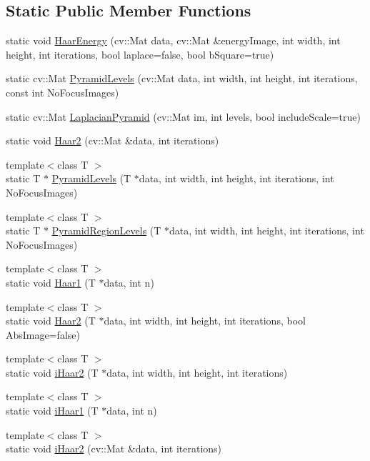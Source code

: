 \subsection*{Static Public Member Functions}
\begin{DoxyCompactItemize}
\item 
static void \hyperlink{class_haar_afa323789e73c94995eba32e09d9aa026}{Haar\+Energy} (cv\+::\+Mat data, cv\+::\+Mat \&energy\+Image, int width, int height, int iterations, bool laplace=false, bool b\+Square=true)
\item 
static cv\+::\+Mat \hyperlink{class_haar_a5a0726cb9e3a28295ba4ac64f654aa36}{Pyramid\+Levels} (cv\+::\+Mat data, int width, int height, int iterations, const int No\+Focus\+Images)
\item 
static cv\+::\+Mat \hyperlink{class_haar_ad85443bf4bbe9d65be10acbd0d89093b}{Laplacian\+Pyramid} (cv\+::\+Mat im, int levels, bool include\+Scale=true)
\item 
static void \hyperlink{class_haar_afde8fa7a1d65b505185a29fc7eaf4b2d}{Haar2} (cv\+::\+Mat \&data, int iterations)
\item 
{\footnotesize template$<$class T $>$ }\\static T $\ast$ \hyperlink{class_haar_a6724557f8d0a1660df2a9de85d7ce523}{Pyramid\+Levels} (T $\ast$data, int width, int height, int iterations, int No\+Focus\+Images)
\item 
{\footnotesize template$<$class T $>$ }\\static T $\ast$ \hyperlink{class_haar_a4f48761ec2f91c74df7ef6b501238d2a}{Pyramid\+Region\+Levels} (T $\ast$data, int width, int height, int iterations, int No\+Focus\+Images)
\item 
{\footnotesize template$<$class T $>$ }\\static void \hyperlink{class_haar_a44ab3d3043f2a9c2145629a242e6ed0f}{Haar1} (T $\ast$data, int n)
\item 
{\footnotesize template$<$class T $>$ }\\static void \hyperlink{class_haar_a4b2951fd5ec6f760fc94bd4273e2c544}{Haar2} (T $\ast$data, int width, int height, int iterations, bool Abs\+Image=false)
\item 
{\footnotesize template$<$class T $>$ }\\static void \hyperlink{class_haar_ab2c372ee9f5eec084066ba52de18fbbe}{i\+Haar2} (T $\ast$data, int width, int height, int iterations)
\item 
{\footnotesize template$<$class T $>$ }\\static void \hyperlink{class_haar_aedd7102138b5f942b7fbd539b1ff8143}{i\+Haar1} (T $\ast$data, int n)
\item 
{\footnotesize template$<$class T $>$ }\\static void \hyperlink{class_haar_a4516357f347f25499ac6aebb717e4f48}{i\+Haar2} (cv\+::\+Mat \&data, int iterations)
\end{DoxyCompactItemize}


